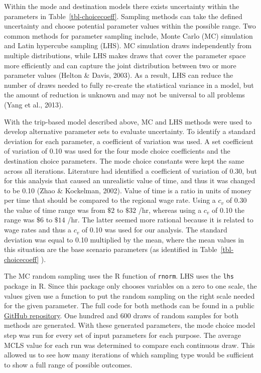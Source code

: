 \documentclass[
  letterpaper,
  authoryear,
  review,
  3p]{elsarticle}
\begin{document}
Within the mode and destination models there exists uncertainty within
the parameters in Table~\ref{tbl-choicecoeff}. Sampling methods can take
the defined uncertainty and choose potential parameter values within the
possible range. Two common methods for parameter sampling include, Monte
Carlo (MC) simulation and Latin hypercube sampling (LHS). MC simulation
draws independently from multiple distributions, while LHS makes draws
that cover the parameter space more efficiently and can capture the
joint distribution between two or more parameter values (Helton \&
Davis, 2003). As a result, LHS can reduce the number of draws needed to
fully re-create the statistical variance in a model, but the amount of
reduction is unknown and may not be universal to all problems (Yang et
al., 2013).

With the trip-based model described above, MC and LHS methods were used
to develop alternative parameter sets to evaluate uncertainty. To
identify a standard deviation for each parameter, a coefficient of
variation was used. A set coefficient of variation of 0.10 was used for
the four mode choice coefficients and the destination choice parameters.
The mode choice constants were kept the same across all iterations.
Literature had identified a coefficient of variation of 0.30, but for
this analysis that caused an unrealistic value of time, and thus it was
changed to be 0.10 (Zhao \& Kockelman, 2002). Value of time is a ratio
in units of money per time that should be compared to the regional wage
rate. Using a \(c_v\) of 0.30 the value of time range was from \(\$2\)
to \(\$32\) /hr, whereas using a \(c_v\) of 0.10 the range was \(\$6\)
to \(\$14\) /hr. The latter seemed more rational because it is related
to wage rates and thus a \(c_v\) of 0.10 was used for our analysis. The
standard deviation was equal to 0.10 multiplied by the mean, where the
mean values in this situation are the base scenario parameters (as
identified in Table~\ref{tbl-choicecoeff} ).

The MC random sampling uses the R function of \texttt{rnorm}. LHS uses
the \texttt{lhs} package in R. Since this package only chooses variables
on a zero to one scale, the values given use a function to put the
random sampling on the right scale needed for the given parameter. The
full code for both methods can be found in a public
\href{https://github.com/natmaegray/sensitivity_thesis}{GitHub
repository}. One hundred and 600 draws of random samples for both
methods are generated. With these generated parameters, the mode choice
model step was run for every set of input parameters for each purpose.
The average MCLS value for each run was determined to compare each
continuous draw. This allowed us to see how many iterations of which
sampling type would be sufficient to show a full range of possible
outcomes.
\end{document}
